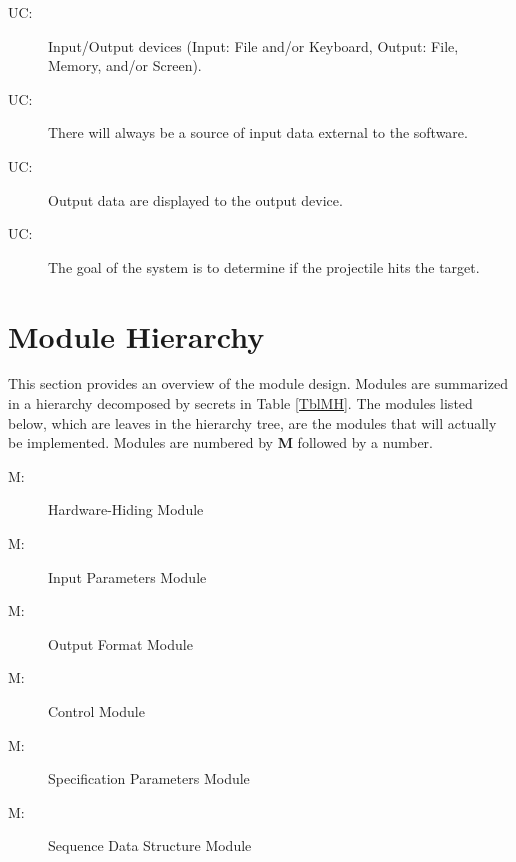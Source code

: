 \documentclass[12pt]{article}
\newcounter{ucnum}
\newcommand{\uctheucnum}{UC\theucnum}
\newcounter{mnum}
\newcommand{\mthemnum}{M\themnum}
\begin{document}
\begin{description}
\item[ \uctheucnum \label{ucIO}:] Input/Output devices
  (Input: File and/or Keyboard, Output: File, Memory, and/or Screen).
\item[ \uctheucnum \label{ucInput}:] There will always be
  a source of input data external to the software.
\item[ \uctheucnum \label{ucOutput}:] Output data are
  displayed to the output device.
\item[ \uctheucnum \label{ucGoal}:] The goal of the system
  is to determine if the projectile hits the target.
\end{description}

\section{Module Hierarchy} \label{SecMH}

This section provides an overview of the module design. Modules are summarized
in a hierarchy decomposed by secrets in Table \ref{TblMH}. The modules listed
below, which are leaves in the hierarchy tree, are the modules that will
actually be implemented. Modules are numbered by \textbf{M}
followed by a number. 

\begin{description}
\item [ \mthemnum \label{mHH}:] Hardware-Hiding Module
\item [ \mthemnum \label{mParams}:] Input Parameters Module
\item [ \mthemnum \label{mOutput}:] Output Format Module
\item [ \mthemnum \label{mControl}:] Control Module
\item [ \mthemnum \label{mSpecParams}:] Specification Parameters Module
\item [ \mthemnum \label{mSeqDS}:] Sequence Data Structure Module
\end{description}
\end{document}
